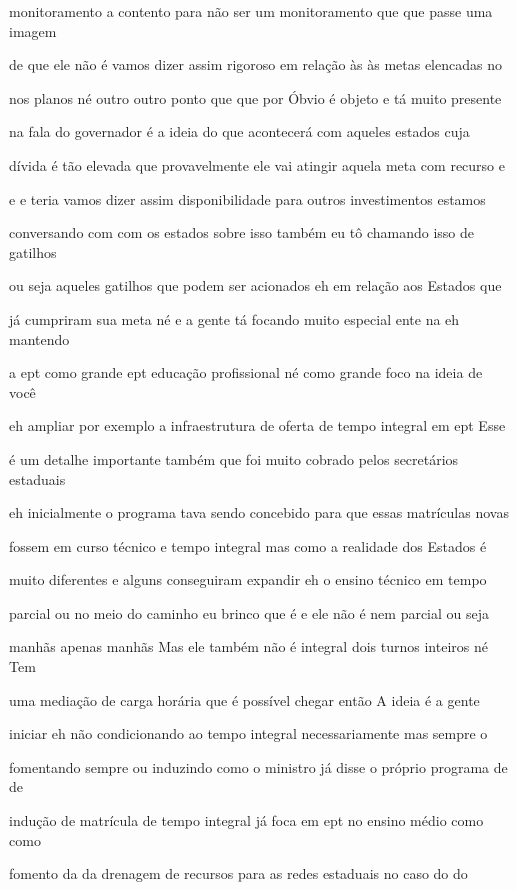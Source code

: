 \documentclass[a4paper,12pt]{article}
\begin{document}
monitoramento a contento para não ser um monitoramento que que passe uma imagem

de que ele não é vamos dizer assim rigoroso em relação às às metas elencadas no

nos planos né outro outro ponto que que por Óbvio é objeto e tá muito presente

na fala do governador é a ideia do que acontecerá com aqueles estados cuja

dívida é tão elevada que provavelmente ele vai atingir aquela meta com recurso e

e e teria vamos dizer assim disponibilidade para outros investimentos estamos

conversando com com os estados sobre isso também eu tô chamando isso de gatilhos

ou seja aqueles gatilhos que podem ser acionados eh em relação aos Estados que

já cumpriram sua meta né e a gente tá focando muito especial ente na eh mantendo

a ept como grande ept educação profissional né como grande foco na ideia de você

eh ampliar por exemplo a infraestrutura de oferta de tempo integral em ept Esse

é um detalhe importante também que foi muito cobrado pelos secretários estaduais

eh inicialmente o programa tava sendo concebido para que essas matrículas novas

fossem em curso técnico e tempo integral mas como a realidade dos Estados é

muito diferentes e alguns conseguiram expandir eh o ensino técnico em tempo

parcial ou no meio do caminho eu brinco que é e ele não é nem parcial ou seja

manhãs apenas manhãs Mas ele também não é integral dois turnos inteiros né Tem

uma mediação de carga horária que é possível chegar então A ideia é a gente

iniciar eh não condicionando ao tempo integral necessariamente mas sempre o

fomentando sempre ou induzindo como o ministro já disse o próprio programa de de

indução de matrícula de tempo integral já foca em ept no ensino médio como como

fomento da da drenagem de recursos para as redes estaduais no caso do do
\end{document}
